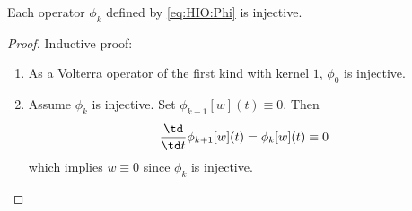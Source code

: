 \begin{lemma}{}{} \label{prop:HIO:phi_injective}
	Each operator $\phi_k$ defined by \eqref{eq:HIO:Phi} is injective.
\end{lemma}
	\begin{proof}
	Inductive proof:
	\begin{enumerate}
	\item As a Volterra operator of the first kind with kernel $1$, $\phi_0$ is 
	injective.
	\item Assume $\phi_k$ is injective. Set $\phi_{k+1}[w](t)\equiv 0$. Then
	\begin{equation}	 
	\frac{\td}{\td t}\phi_{k+1}[w](t)=\phi_k[w](t)\equiv 0
	\end{equation}	
	 which implies
	 $w\equiv 0$ since $\phi_k$ is injective.
	\end{enumerate}
	\end{proof}